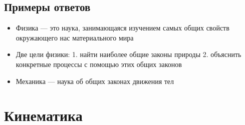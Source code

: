 \documentclass[12pt,a4paper]{report}
\begin{document}
\section{Примеры ответов}
\begin{itemize}
\item Физика --- это наука, занимающаяся изучением самых общих свойств окружающего нас материального мира
\item Две цели физики: 1. найти наиболее общие законы природы 2. объяснить конкретные процессы с помощью этих общих законов
\item Механика --- наука об общих законах движения тел
\end{itemize} 

\chapter{Кинематика}
\end{document}
